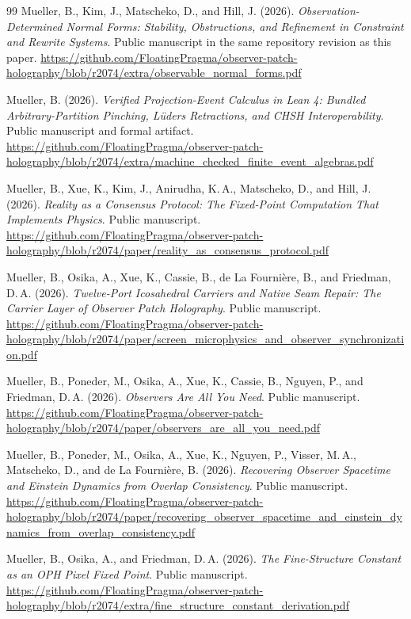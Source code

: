 \documentclass[11pt]{article}
\theoremstyle{definition}
\theoremstyle{remark}
\begin{document}
{\begin{thebibliography}{99}
Mueller, B., Kim, J., Matscheko, D., and Hill, J. (2026).
\emph{Observation-Determined Normal Forms: Stability, Obstructions, and
Refinement in Constraint and Rewrite Systems}. Public manuscript in the same repository revision as this paper.
\url{https://github.com/FloatingPragma/observer-patch-holography/blob/r2074/extra/observable_normal_forms.pdf}

Mueller, B. (2026). \emph{Verified Projection-Event Calculus in Lean 4:
Bundled Arbitrary-Partition Pinching, L\"uders Retractions, and CHSH
Interoperability}. Public manuscript and formal artifact.
\url{https://github.com/FloatingPragma/observer-patch-holography/blob/r2074/extra/machine_checked_finite_event_algebras.pdf}

Mueller, B., Xue, K., Kim, J., Anirudha, K.\,A., Matscheko, D., and Hill, J. (2026).
\emph{Reality as a Consensus Protocol: The Fixed-Point Computation That
Implements Physics}. Public manuscript.
\url{https://github.com/FloatingPragma/observer-patch-holography/blob/r2074/paper/reality_as_consensus_protocol.pdf}

Mueller, B., Osika, A., Xue, K., Cassie, B., de La Fourni\`ere, B., and Friedman, D.\,A.
(2026).
 \emph{Twelve-Port Icosahedral Carriers and Native Seam Repair: The Carrier Layer of Observer Patch Holography}. Public
manuscript.
\url{https://github.com/FloatingPragma/observer-patch-holography/blob/r2074/paper/screen_microphysics_and_observer_synchronization.pdf}

Mueller, B., Poneder, M., Osika, A., Xue, K., Cassie, B., Nguyen, P., and Friedman, D.\,A.
(2026). \emph{Observers Are All You Need}. Public manuscript.
\url{https://github.com/FloatingPragma/observer-patch-holography/blob/r2074/paper/observers_are_all_you_need.pdf}

Mueller, B., Poneder, M., Osika, A., Xue, K., Nguyen, P., Visser, M.\,A.,
Matscheko, D., and de La Fourni\`ere, B. (2026). \emph{Recovering Observer
Spacetime and Einstein
Dynamics from Overlap Consistency}. Public manuscript.
\url{https://github.com/FloatingPragma/observer-patch-holography/blob/r2074/paper/recovering_observer_spacetime_and_einstein_dynamics_from_overlap_consistency.pdf}

Mueller, B., Osika, A., and Friedman, D.\,A. (2026). \emph{The Fine-Structure Constant as an OPH
Pixel Fixed Point}. Public manuscript.
\url{https://github.com/FloatingPragma/observer-patch-holography/blob/r2074/extra/fine_structure_constant_derivation.pdf}


\end{thebibliography}}
\end{document}
